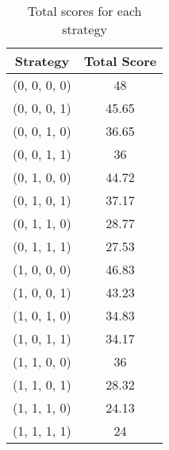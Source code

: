 \begin{table}[h]
\centering
\begin{tabular}{| c | c |}
\hline
\textbf{Strategy} & \textbf{Total Score} \\ \hline
(0, 0, 0, 0) & 48 \\
(0, 0, 0, 1) & 45.65 \\
(0, 0, 1, 0) & 36.65 \\
(0, 0, 1, 1) & 36 \\
(0, 1, 0, 0) & 44.72 \\
(0, 1, 0, 1) & 37.17 \\
(0, 1, 1, 0) & 28.77 \\
(0, 1, 1, 1) & 27.53 \\
(1, 0, 0, 0) & 46.83 \\
(1, 0, 0, 1) & 43.23 \\
(1, 0, 1, 0) & 34.83 \\
(1, 0, 1, 1) & 34.17 \\
(1, 1, 0, 0) & 36 \\
(1, 1, 0, 1) & 28.32 \\
(1, 1, 1, 0) & 24.13 \\
(1, 1, 1, 1) & 24 \\\hline
\end{tabular}
\caption{Total scores for each strategy} \label{tab:scores_table_total}
\end{table}